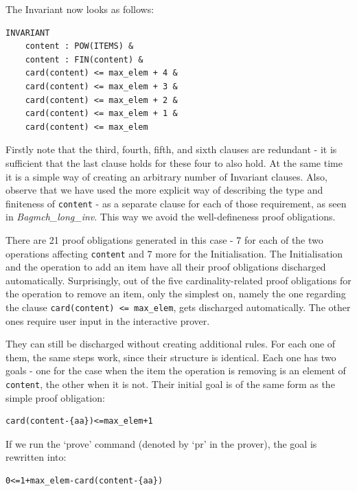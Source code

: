 \documentclass[12pt,journal,duplex]{IEEEtran}
\begin{document}
	The Invariant now looks as follows:
	\begin{lstlisting}
INVARIANT
	content : POW(ITEMS) &
	content : FIN(content) &
	card(content) <= max_elem + 4 &
	card(content) <= max_elem + 3 &
	card(content) <= max_elem + 2 &
	card(content) <= max_elem + 1 &
	card(content) <= max_elem
	\end{lstlisting}
	Firstly note that the third, fourth, fifth, and sixth clauses are redundant - it is sufficient that the last clause holds for these four to also hold. At the same time it is a simple way of creating an arbitrary number of Invariant clauses. Also, observe that we have used the more explicit way of describing the type and finiteness of \texttt{content} - as a separate clause for each of those requirement, as seen in \emph{Bagmch\_long\_inv}. This way we avoid the well-defineness proof obligations.

	There are 21 proof obligations generated in this case - 7 for each of the two operations affecting \texttt{content} and 7 more for the Initialisation. The Initialisation and the operation to add an item have all their proof obligations discharged automatically. Surprisingly, out of the five cardinality-related proof obligations for the operation to remove an item, only the simplest on, namely the one regarding the clause \texttt{card(content) <= max\_elem}, gets discharged automatically. The other ones require user input in the interactive prover.

	They can still be discharged without creating additional rules. For each one of them, the same steps work, since their structure is identical. Each one has two goals - one for the case when the item the operation is removing is an element of \texttt{content}, the other when it is not. Their initial goal is of the same form as the simple proof obligation:
	\begin{lstlisting}
card(content-{aa})<=max_elem+1
	\end{lstlisting}
	If we run the `prove' command (denoted by `pr' in the prover), the goal is rewritten into:
	\begin{lstlisting}
0<=1+max_elem-card(content-{aa})
	\end{lstlisting}
\end{document}
